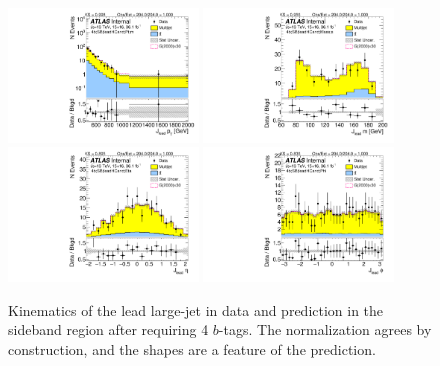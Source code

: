 \begin{figure}[htbp!]
\begin{center}
\includegraphics[width=0.45\textwidth,angle=-90]{figures/boosted/Sideband/b77_FourTag_Sideband_leadHCand_Pt_m_1.pdf}
\includegraphics[width=0.45\textwidth,angle=-90]{figures/boosted/Sideband/b77_FourTag_Sideband_leadHCand_Mass_s.pdf}\\
\includegraphics[width=0.45\textwidth,angle=-90]{figures/boosted/Sideband/b77_FourTag_Sideband_leadHCand_Eta.pdf}
\includegraphics[width=0.45\textwidth,angle=-90]{figures/boosted/Sideband/b77_FourTag_Sideband_leadHCand_Phi.pdf}
  \caption{Kinematics of the lead large-\R jet in data and prediction in the sideband region after requiring 4 $b$-tags. The normalization agrees by construction, and the shapes are a feature of the prediction.}
  \label{fig:boosted-4b-sideband-ak10-lead}
\end{center}
\end{figure}

